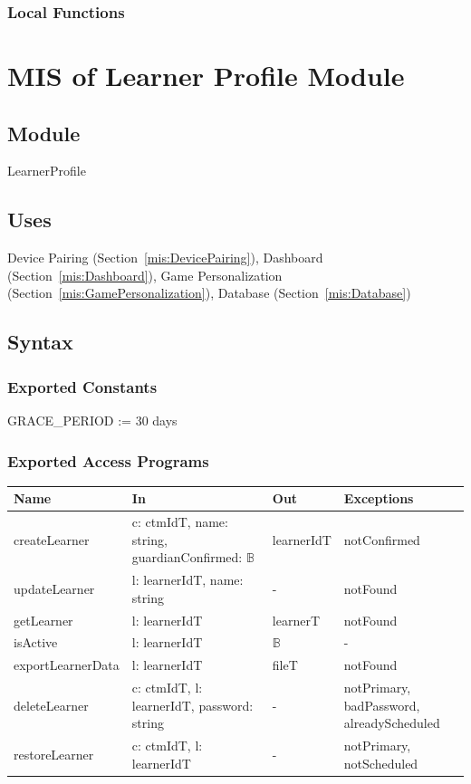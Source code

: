 \documentclass[12pt, titlepage]{article}
\newcommand{\Mref}[1]{Section~\ref{#1}}
\begin{document}
\subsubsection{Local Functions}

\newpage

\section{MIS of Learner Profile Module} \label{mis:LearnerProfile}

\subsection{Module}

LearnerProfile

\subsection{Uses}

Device Pairing (\Mref{mis:DevicePairing}), Dashboard
(\Mref{mis:Dashboard}), Game Personalization
(\Mref{mis:GamePersonalization}), Database (\Mref{mis:Database})

\subsection{Syntax}

\subsubsection{Exported Constants}

GRACE\_PERIOD := 30 days

\subsubsection{Exported Access Programs}

\begin{center}
\small
\begin{tabular}{p{3.3cm} p{4.7cm} p{2.6cm} p{2.8cm}}
\hline
\textbf{Name} & \textbf{In} & \textbf{Out} & \textbf{Exceptions} \\
\hline
createLearner & c: ctmIdT, name: string, guardianConfirmed: $\mathbb{B}$ & learnerIdT & notConfirmed \\
updateLearner & l: learnerIdT, name: string & - & notFound \\
getLearner & l: learnerIdT & learnerT & notFound \\
isActive & l: learnerIdT & $\mathbb{B}$ & - \\
exportLearnerData & l: learnerIdT & fileT & notFound \\
deleteLearner & c: ctmIdT, l: learnerIdT, password: string & - & notPrimary, badPassword, alreadyScheduled \\
restoreLearner & c: ctmIdT, l: learnerIdT & - & notPrimary, notScheduled \\
\hline
\end{tabular}
\end{center}
\end{document}
